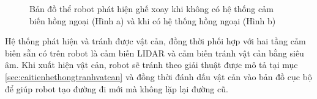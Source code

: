 \begin{figure}[htbp]
    \centering
    \hspace{8pt}
    \caption{Bản đồ thể robot phát hiện ghế xoay khi không có hệ thống cảm biến hồng ngoại (Hình a) và khi có hệ thống hồng ngoại (Hình b)}
    \label{fig:rb_with_obstacle_in_rviz}
\end{figure}


Hệ thống phát hiện và tránh được vật cản, đồng thời phối hợp với hai tầng cảm biến sẵn có trên robot là cảm biến LIDAR và cảm biến tránh vật cản bằng siêu âm. Khi xuất hiện vật cản, robot sẽ tránh theo giải thuật được mô tả tại mục \ref{sec:caitienhethongtranhvatcan} và đồng thời đánh dấu vật cản vào bản đồ cục bộ để giúp robot tạo đường đi mới mà không lặp lại đường cũ.

